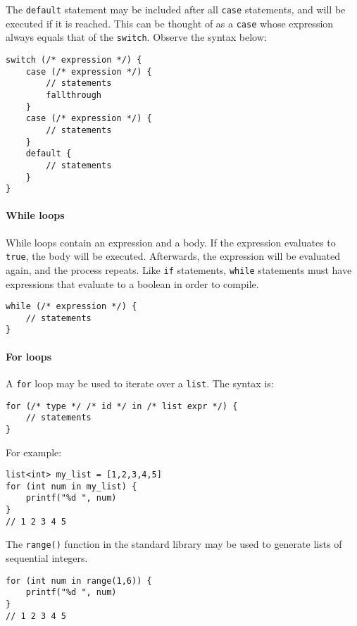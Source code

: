 \documentclass[]{article}
\begin{document}
The \texttt{default} statement may be included after all \texttt{case}
statements, and will be executed if it is reached. This can be thought
of as a \texttt{case} whose expression always equals that of the
\texttt{switch}. Observe the syntax below:

\begin{verbatim}
switch (/* expression */) {
    case (/* expression */) {
        // statements
        fallthrough
    }
    case (/* expression */) {
        // statements
    }
    default {
        // statements
    }
}
\end{verbatim}

\paragraph{While loops}\label{while-loops}

While loops contain an expression and a body. If the expression
evaluates to \texttt{true}, the body will be executed. Afterwards, the
expression will be evaluated again, and the process repeats. Like
\texttt{if} statements, \texttt{while} statements must have expressions
that evaluate to a boolean in order to compile.

\begin{verbatim}
while (/* expression */) {
    // statements
}
\end{verbatim}

\paragraph{For loops}\label{for-loops}

A \texttt{for} loop may be used to iterate over a \texttt{list}. The
syntax is:

\begin{verbatim}
for (/* type */ /* id */ in /* list expr */) {
    // statements
}
\end{verbatim}

For example:

\begin{verbatim}
list<int> my_list = [1,2,3,4,5]
for (int num in my_list) {
    printf("%d ", num)
}
// 1 2 3 4 5
\end{verbatim}

The \texttt{range()} function in the standard library may be used to
generate lists of sequential integers.

\begin{verbatim}
for (int num in range(1,6)) {
    printf("%d ", num)
}
// 1 2 3 4 5
\end{verbatim}
\end{document}

